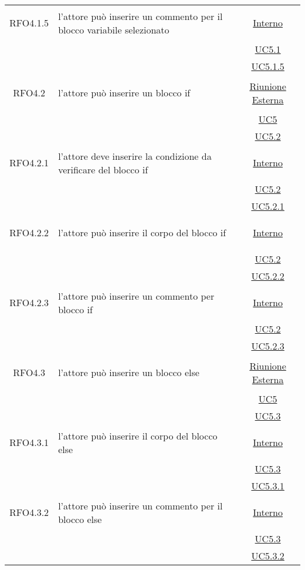 \begin{longtable}{|c|>{\centering}m{7cm}|c|}
\hypertarget{RFO4.1.5}{RFO4.1.5} & l'attore può inserire un commento per il blocco variabile selezionato&\hyperlink{Interno}{Interno}\\
& &\hyperref[UC5.1]{UC5.1}\\
& &\hyperref[UC5.1.5]{UC5.1.5}\\ \hline

\hypertarget{RFO4.2}{RFO4.2} & l'attore può inserire un blocco if & \hyperlink{Riunione Esterna}{Riunione Esterna}\\
& &\hyperref[UC5]{UC5}\\
& &\hyperref[UC5.2]{UC5.2}\\ \hline

\hypertarget{RFO4.2.1}{RFO4.2.1} & l'attore deve inserire la condizione da verificare del blocco if & \hyperlink{Interno}{Interno}\\
& &\hyperref[UC5.2]{UC5.2}\\
& &\hyperref[UC5.2.1]{UC5.2.1}\\ \hline

\hypertarget{RFO4.2.2}{RFO4.2.2} & l'attore può inserire il corpo del blocco if & \hyperlink{Interno}{Interno}\\
& &\hyperref[UC5.2]{UC5.2}\\
& &\hyperref[UC5.2.2]{UC5.2.2}\\ \hline

\hypertarget{RFO4.2.3}{RFO4.2.3} & l'attore può inserire un commento per blocco if & \hyperlink{Interno}{Interno}\\
& &\hyperref[UC5.2]{UC5.2}\\
& &\hyperref[UC5.2.3]{UC5.2.3}\\ \hline

\hypertarget{RFO4.3}{RFO4.3} & l'attore può inserire un blocco else & \hyperlink{Riunione Esterna}{Riunione Esterna}\\
& &\hyperref[UC5]{UC5}\\
& &\hyperref[UC5.3]{UC5.3}\\ \hline

\hypertarget{RFO4.3.1}{RFO4.3.1} & l'attore può inserire il corpo del blocco else &\hyperlink{Interno}{Interno}\\
& &\hyperref[UC5.3]{UC5.3}\\
& &\hyperref[UC5.3.1]{UC5.3.1}\\ \hline

\hypertarget{RFO4.3.2}{RFO4.3.2} & l'attore può inserire un commento per il blocco else & \hyperlink{Interno}{Interno}\\
& &\hyperref[UC5.3]{UC5.3}\\
& &\hyperref[UC5.3.2]{UC5.3.2}\\ \hline


\end{longtable}
